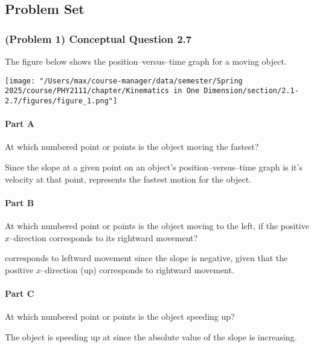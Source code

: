 
\subsection{Problem Set}

\subsubsection{(Problem 1) Conceptual Question 2.7}

The figure below shows the position--versus--time graph for a moving object.

\begin{center}
	\texttt{[image: "/Users/max/course-manager/data/semester/Spring 2025/course/PHY2111/chapter/Kinematics in One Dimension/section/2.1-2.7/figures/figure\_1.png"]}
\end{center}

\paragraph{Part A}
At which numbered point or points is the object moving the fastest?

\begin{solution}
	Since the slope at a given point on an object's position--versus--time graph is it's velocity at that point,  represents the fastest motion for the object.
\end{solution}

\paragraph{Part B}
At which numbered point or points is the object moving to the left, if the positive $x$--direction corresponds to its rightward movement?

\begin{solution}
	 corresponds to leftward movement since the slope is negative, given that the positive $x$--direction (up) corresponds to rightward movement.
\end{solution}

\paragraph{Part C}
At which numbered point or points is the object speeding up?

\begin{solution}
	The object is speeding up at  since the absolute value of the slope is increasing.
\end{solution}

